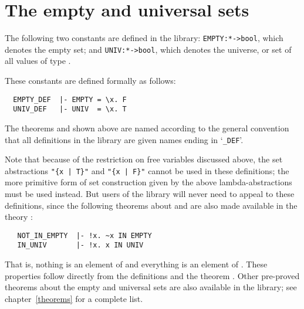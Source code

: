 \section{The empty and universal sets}

The following two constants are defined in the  library:
{\small\verb!EMPTY:*->bool!}, which denotes the empty set; and
{\small\verb!UNIV:*->bool!}, which denotes the universe, or set of all values
of type \ml{*}.{\samepage  These constants are defined formally as follows:

\begin{hol}
\begin{verbatim}
  EMPTY_DEF  |- EMPTY = \x. F
  UNIV_DEF   |- UNIV  = \x. T
\end{verbatim}\end{hol}

\noindent The theorems
 and  shown above are named according
to the general convention that all definitions in the  library
are given names ending 
in `{\small\verb!_DEF!}'.}

\pagebreak[3] 

Note that because of the restriction on free variables discussed above, the set
abstractions {\small\verb!"{x | T}"!} and {\small\verb!"{x | F}"!} cannot be
used in these definitions; the more primitive form of set construction given by
the above lambda-abstractions must be used instead.  But users of the library
will never need to appeal to these definitions, since the following theorems
about  and  are also made available in the theory
:

\begin{hol}
\begin{verbatim}
   NOT_IN_EMPTY  |- !x. ~x IN EMPTY
   IN_UNIV       |- !x. x IN UNIV
\end{verbatim}\end{hol}

\noindent That is, nothing is an element of  and everything is an
element of . These properties follow directly from the definitions and
the theorem .  Other pre-proved theorems about the empty and
universal sets are also available in the library; see chapter~\ref{theorems}
for a complete list.

